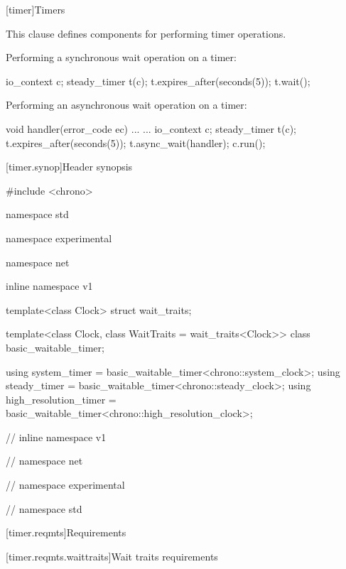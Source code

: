 
[timer]{Timers}

\pnum
This clause defines components for performing timer operations.

\pnum
\begin{example} Performing a synchronous wait operation on a timer:
\begin{codeblock}
io_context c;
steady_timer t(c);
t.expires_after(seconds(5));
t.wait();
\end{codeblock}
 \end{example}

\pnum
\begin{example} Performing an asynchronous wait operation on a timer:
\begin{codeblock}
void handler(error_code ec) { ... }
...
io_context c;
steady_timer t(c);
t.expires_after(seconds(5));
t.async_wait(handler);
c.run();
\end{codeblock}
 \end{example}


%
[timer.synop]{Header  synopsis}

\begin{codeblock}
#include <chrono>

namespace std {
namespace experimental {
namespace net {
inline namespace v1 {

  template<class Clock> struct wait_traits;

  template<class Clock, class WaitTraits = wait_traits<Clock>>
    class basic_waitable_timer;

  using system_timer = basic_waitable_timer<chrono::system_clock>;
  using steady_timer = basic_waitable_timer<chrono::steady_clock>;
  using high_resolution_timer = basic_waitable_timer<chrono::high_resolution_clock>;

} // inline namespace v1
} // namespace net
} // namespace experimental
} // namespace std
\end{codeblock}



[timer.reqmts]{Requirements}


[timer.reqmts.waittraits]{Wait traits requirements}

